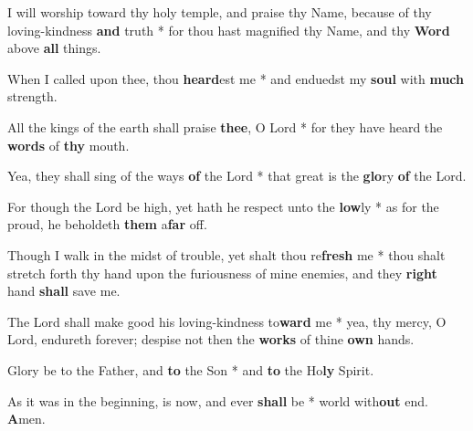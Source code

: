 \begin{multicols}{2}
	I will worship toward thy holy temple, and praise thy Name, because of thy loving-kindness \textbf{and} truth * for thou hast magnified thy Name, and thy \textbf{Word} above \textbf{all} things.
	
	When I called upon thee, thou \textbf{heard}est me * and enduedst my \textbf{soul} with \textbf{much} strength.
	
	All the kings of the earth shall praise \textbf{thee}, O Lord * for they have heard the \textbf{words} of \textbf{thy} mouth.
	
	Yea, they shall sing of the ways \textbf{of} the Lord * that great is the \textbf{glo}ry \textbf{of} the Lord.
	
	For though the Lord be high, yet hath he respect unto the \textbf{low}ly * as for the proud, he beholdeth \textbf{them} a\textbf{far} off.
	
	Though I walk in the midst of trouble, yet shalt thou re\textbf{fresh} me * thou shalt stretch forth thy hand upon the furiousness of mine enemies, and they \textbf{right} hand \textbf{shall} save me.
	
	The Lord shall make good his loving-kindness to\textbf{ward} me * yea, thy mercy, O Lord, endureth forever; despise not then the \textbf{works} of thine \textbf{own} hands.
	
	Glory be to the Father, and \textbf{to} the Son * and \textbf{to} the Ho\textbf{ly} Spirit.
	
	As it was in the beginning, is now, and ever \textbf{shall} be * world with\textbf{out} end. \textbf{A}men.
\end{multicols} 